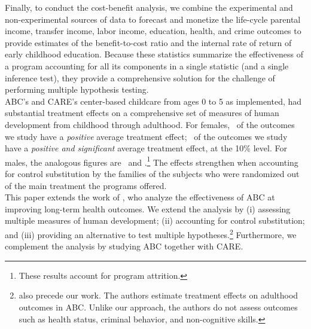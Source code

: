 \noindent Finally, to conduct the cost-benefit analysis, we combine the experimental and non-experimental sources of data to forecast and monetize the life-cycle parental income, transfer income, labor income, education, health, and crime outcomes to provide estimates of the benefit-to-cost ratio and the internal rate of return of early childhood education. Because these statistics summarize the effectiveness of a program accounting for all its components in a single statistic (and a single inference test), they provide a comprehensive solution for the challenge of performing multiple hypothesis testing.\\

\noindent ABC's and CARE's center-based childcare from ages 0 to 5 as implemented, had substantial treatment effects on a comprehensive set of measures of human development from childhood through adulthood. For females, \positivef\ of the outcomes we study have a \textit{positive} average treatment effect; \positivesf\ of the outcomes we study have a \textit{positive and significant} average treatment effect, at the 10\% level. For males, the analogous figures are \positivem\ and \positivesm.\footnote{These results account for program attrition.} The effects strengthen when accounting for control substitution by the families of the subjects who were randomized out of the main treatment  the programs offered.\\

\noindent This paper extends the work of \citet{Campbell_Conti_etal_2014_EarlyChildhoodInvestments}, who analyze the effectiveness of ABC at improving long-term health outcomes. We extend the analysis by (i) assessing multiple measures of human development; (ii) accounting for control substitution; and (iii) providing an alternative to test multiple hypotheses.\footnote{\cite{Campbell_Pungello_etal_2012_DP} also precede our work. The authors estimate treatment effects on adulthood outcomes in ABC. Unlike our approach, the authors do not assess outcomes such as health status, criminal behavior, and non-cognitive skills.} Furthermore, we complement the analysis by studying ABC together with CARE.\\ 

